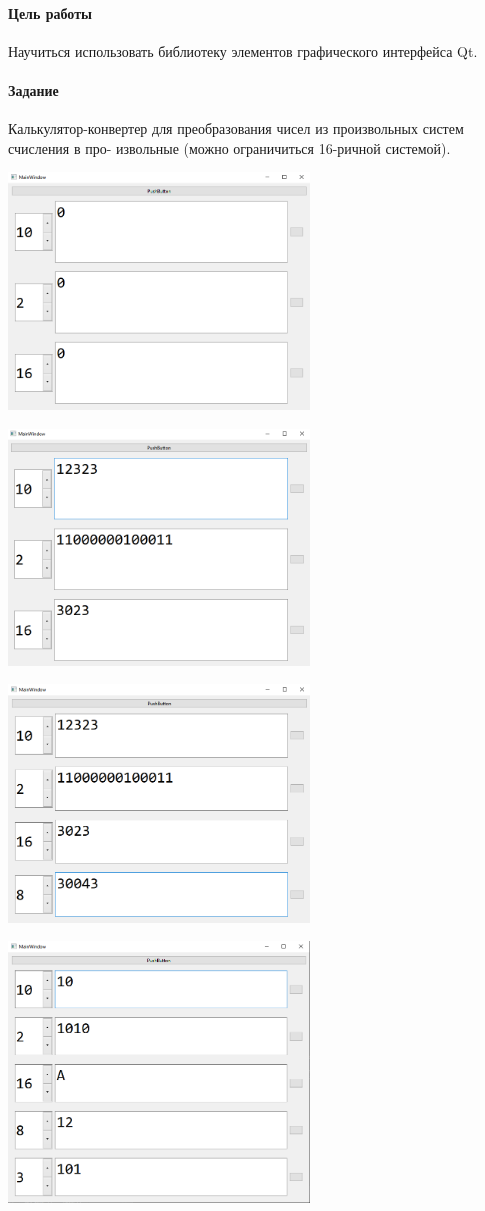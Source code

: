 \paragraph{Цель работы}
Научиться использовать библиотеку элементов графического интерфейса Qt.

\paragraph{Задание}
Калькулятор-конвертер для преобразования чисел из произвольных систем счисления в про-
извольные (можно ограничиться 16-ричной системой).




\includegraphics[width=0.6\textwidth]{scr1.PNG}

\includegraphics[width=0.6\textwidth]{scr2.PNG}

\includegraphics[width=0.6\textwidth]{scr3.PNG}

\includegraphics[width=0.6\textwidth]{scr4.PNG}